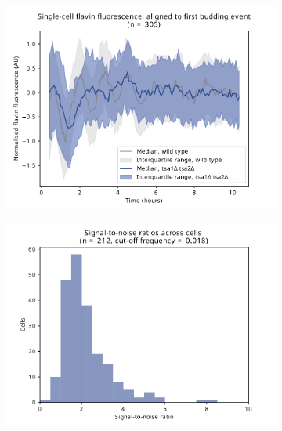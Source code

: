 \begin{figure}
\begin{subfigure}[t]{0.45\textwidth}
   \caption{
   }
   \label{fig:biology-tsa1tsa2-acf}
  \end{subfigure}

  \begin{subfigure}[t]{0.45\textwidth}
   \centering
   \includegraphics[width=\textwidth]{tsa1tsa2morgan_1649_6.pdf}
   \caption{
   }
   \label{fig:biology-tsa1tsa2-median}
  \end{subfigure}%
  \begin{subfigure}[t]{0.45\textwidth}
   \centering
   \includegraphics[width=\textwidth]{tsa1tsa2morgan_1649_10.pdf}
   \caption{
   }
   \label{fig:biology-tsa1tsa2-snr}
  \end{subfigure}


\end{figure}
